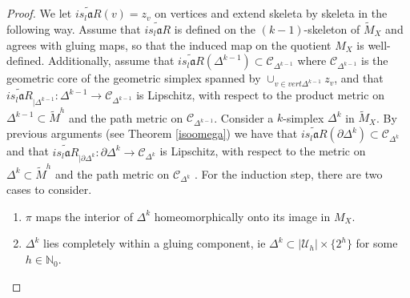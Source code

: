 \documentclass[a4paper,11pt]{article}
\theoremstyle{definition}
\theoremstyle{plain}
\theoremstyle{remark}
\begin{document}
{\begin{proof}
We let $\widetilde{is_{l}\mathfrak{a}R}(v) = z_v$ on vertices and extend skeleta by skeleta in the following way. Assume that $\widetilde{is_{l} \mathfrak{a} R}$ is defined on the $(k-1)$-skeleton of $\tilde{M}_{X}$ and agrees with gluing maps, so that the induced map on the quotient $M_{X}$ is well-defined. Additionally, assume that $\widetilde{is_{l} \mathfrak{a} R}(\Delta^{k-1}) \subset \mathscr{C}_{\Delta^{k-1}}$ where $ \mathscr{C}_{\Delta^{k-1}}$ is the geometric core of the geometric simplex spanned by $\cup_{v\in vert \Delta^{k-1}} z_{v}$, and that $\widetilde{is_{l} \mathfrak{a} R}_{|\Delta^{k-1}}: \Delta^{k-1}\rightarrow \mathscr{C}_{\Delta^{k-1}}$ is Lipschitz, with respect to the product metric on $\Delta^{k-1} \subset \tilde{M}^{h}$ and the path metric on  $\mathscr{C}_{\Delta^{k-1}}$. Consider a $k$-simplex $\Delta^k$ in $\tilde{M}_{X}$. By previous arguments (see Theorem \ref{isoomega}) we have that $\widetilde{is_{l}\mathfrak{a}R}(\partial \Delta^{k})\subset \mathscr{C}_{\Delta^k}$ and that $\widetilde{is_{l}\mathfrak{a}R}_{|\partial \Delta^{k}}: \partial \Delta^{k}\rightarrow \mathscr{C}_{\Delta^{k}}$ is Lipschitz, with respect to the metric on $\Delta^{k} \subset  \tilde{M}^{h}$ and the path metric on $\mathscr{C}_{\Delta^{k}}$ . For the induction step, there are two cases to consider. 

\begin{enumerate}
\item $\pi$ maps the interior of $\Delta^k$ homeomorphically onto its image in $M_{X}$. 
\item $\Delta^k$ lies completely within a gluing component, ie $\Delta^k\subset |\mathcal{U}_{h}| \times \{2^h\}$ for some $h\in \mathbb{N}_{0}$.
\end{enumerate}


\end{proof}}
\end{document}

